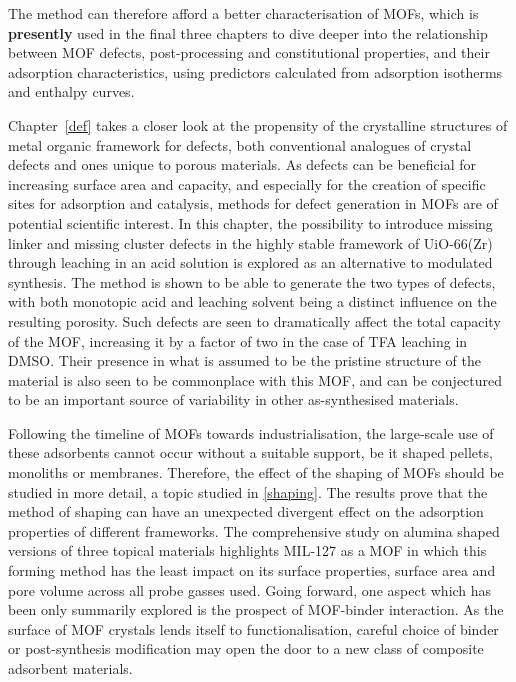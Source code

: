 The method can therefore afford a better characterisation of \glspl{MOF},
which is \textbf{presently} used in the final three chapters 
to dive deeper into the relationship between \gls{MOF} defects,
post-processing and constitutional properties,
and their adsorption characteristics, using predictors calculated from
adsorption isotherms and enthalpy curves.

Chapter~\ref{def} takes a closer look at the propensity of the 
crystalline structures of metal organic framework for defects,
both conventional analogues of crystal defects and ones unique
to porous materials. As defects can be beneficial for increasing 
surface area and capacity, and especially for the creation
of specific sites for adsorption and catalysis, methods for 
defect generation in \glspl{MOF} are of potential scientific interest.
In this chapter, the possibility to introduce missing linker and 
missing cluster defects in the highly stable framework of UiO-66(Zr)
through leaching in an acid solution is explored as an alternative 
to modulated synthesis. The method is shown to be able to generate
the two types of defects, with both monotopic acid and leaching 
solvent being a distinct influence on the resulting porosity.
Such defects are seen to dramatically affect the total capacity 
of the \gls{MOF}, increasing it by a factor of two in the case of \gls{TFA}
leaching in \gls{DMSO}. Their presence in what is assumed
to be the pristine structure of the material is also seen 
to be commonplace with this \gls{MOF}, and can be conjectured to be an
important source of variability in other as-synthesised materials.

Following the timeline of \glspl{MOF} towards industrialisation, the 
large-scale use of these adsorbents cannot occur without a suitable
support, be it shaped pellets, monoliths or membranes. Therefore,
the effect of the shaping of \glspl{MOF} should be studied in more detail,
a topic studied in \autoref{shaping}. The results prove that the method
of shaping can have an unexpected divergent effect on the adsorption 
properties of different frameworks. The comprehensive study on 
alumina shaped versions of three topical materials highlights
MIL-127 as a \gls{MOF} in which this forming method has the least impact on
its surface properties, surface area and pore volume across all 
probe gasses used. Going forward, one aspect which has been only 
summarily explored is the prospect of \gls{MOF}-binder interaction. 
As the surface of \gls{MOF} crystals lends itself to functionalisation, 
careful choice of binder or post-synthesis modification may open the
door to a new class of composite adsorbent materials.

